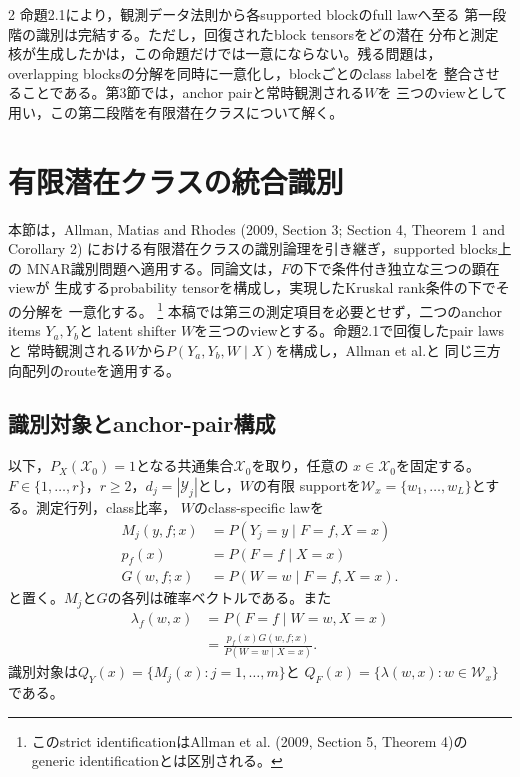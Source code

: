 \documentclass[a4paper,10pt]{article}
\begin{document}
\begin{multicols}{2}
命題2.1により，観測データ法則から各supported blockのfull lawへ至る
第一段階の識別は完結する。ただし，回復されたblock tensorsをどの潜在
分布と測定核が生成したかは，この命題だけでは一意にならない。残る問題は，
overlapping blocksの分解を同時に一意化し，blockごとのclass labelを
整合させることである。第3節では，anchor pairと常時観測される$W$を
三つのviewとして用い，この第二段階を有限潜在クラスについて解く。

\section{有限潜在クラスの統合識別}
本節は，Allman, Matias and Rhodes (2009, Section 3; Section 4, Theorem 1 and
Corollary 2) における有限潜在クラスの識別論理を引き継ぎ，supported blocks上の
MNAR識別問題へ適用する。同論文は，$F$の下で条件付き独立な三つの顕在viewが
生成するprobability tensorを構成し，実現したKruskal rank条件の下でその分解を
一意化する。%
\footnote{このstrict identificationはAllman et al. (2009, Section 5, Theorem 4)の
generic identificationとは区別される。}
本稿では第三の測定項目を必要とせず，二つのanchor items $Y_a,Y_b$と
latent shifter $W$を三つのviewとする。命題2.1で回復したpair lawsと
常時観測される$W$から$P(Y_a,Y_b,W\mid X)$を構成し，Allman et al.と
同じ三方向配列のrouteを適用する。

\subsection{識別対象とanchor-pair構成}

以下，$P_X(\mathcal X_0)=1$となる共通集合$\mathcal X_0$を取り，任意の
$x\in\mathcal X_0$を固定する。
$F\in\{1,\ldots,r\}$，$r\ge2$，$d_j=|\mathcal Y_j|$とし，$W$の有限
supportを$\mathcal W_x=\{w_1,\ldots,w_L\}$とする。測定行列，class比率，
$W$のclass-specific lawを
\begin{subequations}\label{eq:latent-class-components}
\begin{align}
M_j(y,f;x)&=P(Y_j=y\mid F=f,X=x)
  \label{eq:measurement-kernel-definition}\\
p_f(x)&=P(F=f\mid X=x)
  \label{eq:class-proportion-definition}\\
G(w,f;x)&=P(W=w\mid F=f,X=x).
  \label{eq:shifter-law-definition}
\end{align}
\end{subequations}
と置く。$M_j$と$G$の各列は確率ベクトルである。また
\begin{equation}
\begin{aligned}
\lambda_f(w,x)
 &=P(F=f\mid W=w,X=x)\\
 &=\frac{p_f(x)G(w,f;x)}{P(W=w\mid X=x)}.
\end{aligned}
\label{eq:latent-class-posterior}
\end{equation}
識別対象は$Q_Y(x)=\{M_j(x):j=1,\ldots,m\}$と
$Q_F(x)=\{\lambda(w,x):w\in\mathcal W_x\}$である。


\end{multicols}
\end{document}
